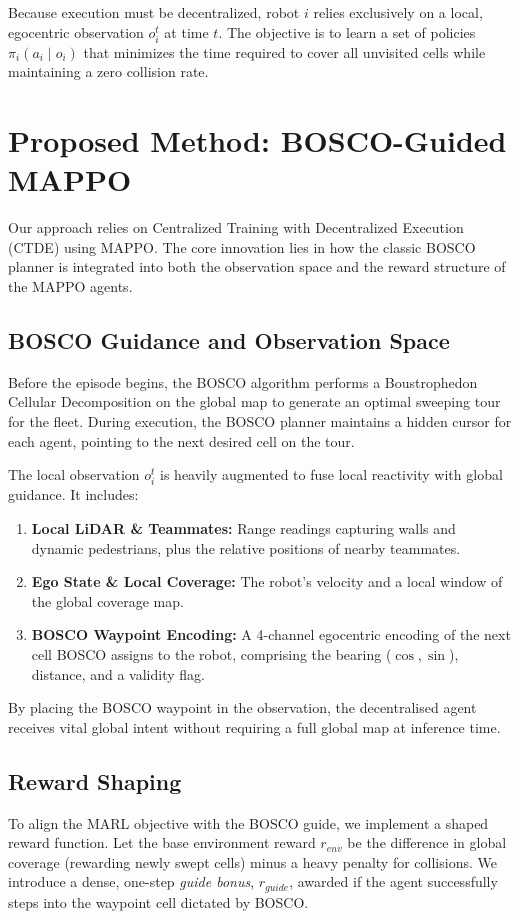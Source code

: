 \documentclass[conference]{IEEEtran}
\begin{document}
Because execution must be decentralized, robot $i$ relies exclusively on a local, egocentric observation $o_i^t$ at time $t$. The objective is to learn a set of policies $\pi_i(a_i \mid o_i)$ that minimizes the time required to cover all unvisited cells while maintaining a zero collision rate.

\section{Proposed Method: BOSCO-Guided MAPPO}
Our approach relies on Centralized Training with Decentralized Execution (CTDE) using MAPPO. The core innovation lies in how the classic BOSCO planner is integrated into both the observation space and the reward structure of the MAPPO agents.

\subsection{BOSCO Guidance and Observation Space}
Before the episode begins, the BOSCO algorithm performs a Boustrophedon Cellular Decomposition on the global map to generate an optimal sweeping tour for the fleet. During execution, the BOSCO planner maintains a hidden cursor for each agent, pointing to the next desired cell on the tour.

The local observation $o_i^t$ is heavily augmented to fuse local reactivity with global guidance. It includes:
\begin{enumerate}
    \item \textbf{Local LiDAR \& Teammates:} Range readings capturing walls and dynamic pedestrians, plus the relative positions of nearby teammates.
    \item \textbf{Ego State \& Local Coverage:} The robot's velocity and a local window of the global coverage map.
    \item \textbf{BOSCO Waypoint Encoding:} A 4-channel egocentric encoding of the next cell BOSCO assigns to the robot, comprising the bearing ($\cos, \sin$), distance, and a validity flag.
\end{enumerate}
By placing the BOSCO waypoint in the observation, the decentralised agent receives vital global intent without requiring a full global map at inference time.

\subsection{Reward Shaping}
To align the MARL objective with the BOSCO guide, we implement a shaped reward function. Let the base environment reward $r_{env}$ be the difference in global coverage (rewarding newly swept cells) minus a heavy penalty for collisions. We introduce a dense, one-step \textit{guide bonus}, $r_{guide}$, awarded if the agent successfully steps into the waypoint cell dictated by BOSCO.
\end{document}
